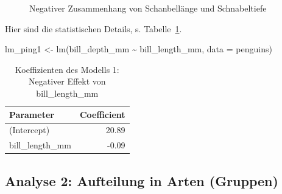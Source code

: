 \documentclass[
  letterpaper,
  twoside,
  open=any]{scrbook}
\newenvironment{Shaded}{\begin{snugshade}}{\end{snugshade}}
\newcommand{\AttributeTok}[1]{\textcolor[rgb]{0.40,0.45,0.13}{#1}}
\newcommand{\FunctionTok}[1]{\textcolor[rgb]{0.28,0.35,0.67}{#1}}
\newcommand{\NormalTok}[1]{\textcolor[rgb]{0.00,0.23,0.31}{#1}}
\newcommand{\OtherTok}[1]{\textcolor[rgb]{0.00,0.23,0.31}{#1}}
\newcommand{\SpecialCharTok}[1]{\textcolor[rgb]{0.37,0.37,0.37}{#1}}
\theoremstyle{definition}
\theoremstyle{definition}
\theoremstyle{definition}
\theoremstyle{remark}
\begin{document}
\begin{figure}[H]


\caption{\label{fig-peng-simpson1}Negativer Zusammenhang von
Schanbellänge und Schnabeltiefe}

\end{figure}%

Hier sind die statistischen Details, s. Tabelle~\ref{tbl-peng-simpson1}.

\begin{Shaded}
\begin{Highlighting}[]
\NormalTok{lm\_ping1 }\OtherTok{\textless{}{-}} \FunctionTok{lm}\NormalTok{(bill\_depth\_mm }\SpecialCharTok{\textasciitilde{}}\NormalTok{ bill\_length\_mm, }\AttributeTok{data =}\NormalTok{ penguins)}
\end{Highlighting}
\end{Shaded}

\begin{longtable}[]{@{}lr@{}}

\caption{\label{tbl-peng-simpson1}Koeffizienten des Modells 1: Negativer
Effekt von bill\_length\_mm}

\tabularnewline

\toprule\noalign{}
Parameter & Coefficient \\
\midrule\noalign{}
\endhead
\bottomrule\noalign{}
\endlastfoot
(Intercept) & 20.89 \\
bill\_length\_mm & -0.09 \\

\end{longtable}

\subsection{Analyse 2: Aufteilung in Arten
(Gruppen)}\label{analyse-2-aufteilung-in-arten-gruppen}
\end{document}
